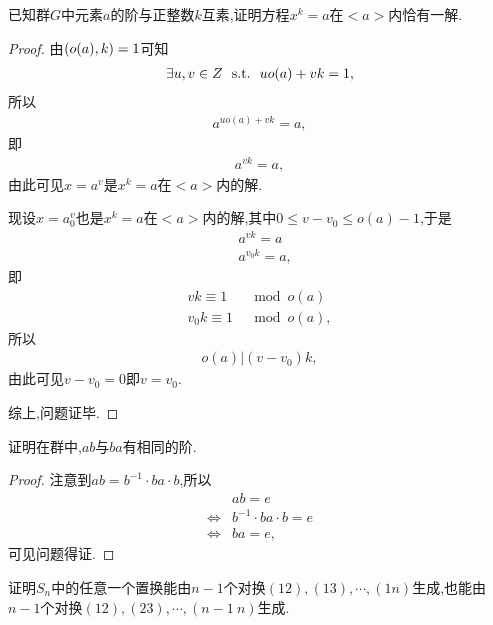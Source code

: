\begin{problem}[P97T3]
    已知群$G$中元素$a$的阶与正整数$k$互素,证明方程$x^k=a$在$<a>$内恰有一解.
\end{problem}
\begin{proof}
    由$\left(o(a),k\right)=1$可知\begin{align*}
        \exists u,v\in \relax{Z}\ \ \mathrm{s.t.}\ \  uo(a)+vk=1,
    \end{align*}所以\begin{align*}
        a^{uo(a)+vk}=a,
    \end{align*}即\begin{align*}
        a^{vk}=a,
    \end{align*}由此可见$x=a^v$是$x^k=a$在$<a>$内的解.

    现设$x=a^v_0$也是$x^k=a$在$<a>$内的解,其中$0\leq v-v_0\leq o(a)-1$,于是\begin{align*}
        &a^{vk}=a\\
        &a^{v_0k}=a,
    \end{align*}即\begin{align*}
        vk\equiv1&\mod o(a)\\
        v_0k\equiv1&\mod o(a),
    \end{align*}所以\begin{align*}
    o(a)|(v-v_0)k,
    \end{align*}由此可见$v-v_0=0$即$v=v_0$.

    综上,问题证毕.
\end{proof}
\begin{problem}[P97T4]
    证明在群中,$ab$与$ba$有相同的阶.
\end{problem}
\begin{proof}
    注意到$ab=b^{-1}\cdot ba\cdot b$,所以\begin{align*}
        &ab=e\\
        \iff&b^{-1}\cdot ba\cdot b=e\\
        \iff&ba=e,
    \end{align*}可见问题得证.
\end{proof}
\begin{problem}[P97T10]
    证明$S_n$中的任意一个置换能由$n-1$个对换$(12),(13),\cdots,(1n)$生成,也能由$n-1$个对换$(12),(23),\cdots,(n-1\ n)$生成.
\end{problem}
